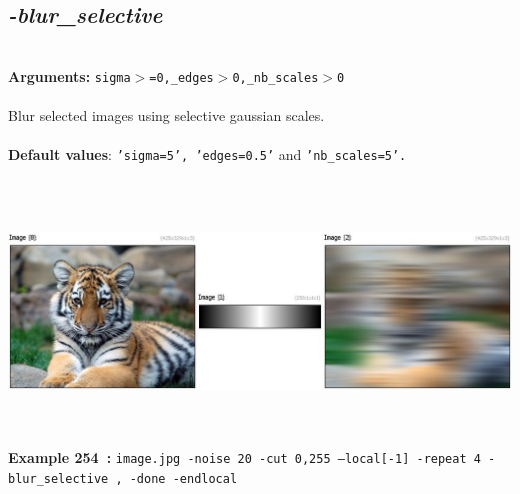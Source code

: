 \documentclass[a4paper,11pt,twoside]{book}
\begin{document}
\subsection{\emph{-blur\_selective} }\vspace*{-0.5em}
~\\\textbf{Arguments: } 
{\small \texttt{sigma$>$=0,\_edges$>$0,\_nb\_scales$>$0}}\\~\\
Blur selected images using selective gaussian scales.
~\\~\\\textbf{Default values}: {\small \texttt{'sigma=5', 'edges=0.5'} and \texttt{'nb\_scales=5'.}}
\begin{center}\includegraphics[keepaspectratio=true,height=7cm,width=\textwidth]{img/gmic_def254.jpg}\\
{\footnotesize \textbf{Example 254~:} \texttt{image.jpg -noise 20 -cut 0,255 --local[-1] -repeat 4 -blur\_selective , -done -endlocal}}
\end{center}
\end{document}
